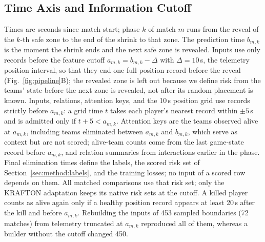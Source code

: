 \documentclass[sigconf,anonymous]{acmart}
\begin{document}
\subsection{Time Axis and Information Cutoff}
\label{sec:method:samples}
Times are seconds since match start; phase $k$ of match $m$ runs from the reveal of the $k$-th safe zone to the end of the shrink to that zone. The prediction time $b_{m,k}$ is the moment the shrink ends and the next safe zone is revealed. Inputs use only records before the feature cutoff $a_{m,k}=b_{m,k}-\Delta$ with $\Delta=10$\,s, the telemetry position interval, so that they end one full position record before the reveal (Fig.~\ref{fig:pipeline}B); the revealed zone is left out because we define risk from the teams' state before the next zone is revealed, not after its random placement is known. Inputs, relations, attention keys, and the 10\,s position grid use records strictly before $a_{m,k}$: a grid time $t$ takes each player's nearest record within $\pm5$\,s and is admitted only if $t+5<a_{m,k}$. Attention keys are the teams observed alive at $a_{m,k}$, including teams eliminated between $a_{m,k}$ and $b_{m,k}$, which serve as context but are not scored; alive-team counts come from the last game-state record before $a_{m,k}$, and relation summaries from interactions earlier in the phase. Final elimination times define the labels, the scored risk set of Section~\ref{sec:method:labels}, and the training losses; no input of a scored row depends on them. All matched comparisons use that risk set; only the KRAFTON adaptation keeps its native risk sets at the cutoff. A killed player counts as alive again only if a healthy position record appears at least 20\,s after the kill and before $a_{m,k}$. Rebuilding the inputs of 453 sampled boundaries (72 matches) from telemetry truncated at $a_{m,k}$ reproduced all of them, whereas a builder without the cutoff changed 450.
\end{document}
